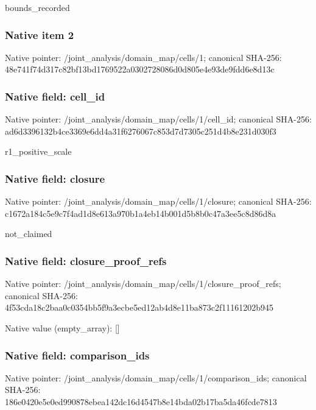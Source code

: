 \documentclass[10pt,a4paper]{article}
\begin{document}
\begingroup\raggedright\sloppy bounds\_\allowbreak{}recorded\par\endgroup

\subsubsection{Native item 2}
Native pointer: /joint\_\allowbreak{}analysis/domain\_\allowbreak{}map/cells/1; canonical SHA-256: 48e741f74d317c82bf13bd1769522a0302728086d0d805e4e93de9fdd6e8d13c

\subsubsection{Native field: cell\_\allowbreak{}id}
Native pointer: /joint\_\allowbreak{}analysis/domain\_\allowbreak{}map/cells/1/cell\_\allowbreak{}id; canonical SHA-256: ad6d3396132b4ce3369e6dd4a31f6276067c853d7d7305c251d4b8e231d030f3

\begingroup\raggedright\sloppy r1\_\allowbreak{}positive\_\allowbreak{}scale\par\endgroup

\subsubsection{Native field: closure}
Native pointer: /joint\_\allowbreak{}analysis/domain\_\allowbreak{}map/cells/1/closure; canonical SHA-256: c1672a184c5e9c7f4ad1d8e613a970b1a4eb14b001d5b8b0c47a3ee5c8d86d8a

\begingroup\raggedright\sloppy not\_\allowbreak{}claimed\par\endgroup

\subsubsection{Native field: closure\_\allowbreak{}proof\_\allowbreak{}refs}
Native pointer: /joint\_\allowbreak{}analysis/domain\_\allowbreak{}map/cells/1/closure\_\allowbreak{}proof\_\allowbreak{}refs; canonical SHA-256: 4f53cda18c2baa0c0354bb5f9a3ecbe5ed12ab4d8e11ba873c2f11161202b945

Native value (empty\_\allowbreak{}array): []

\subsubsection{Native field: comparison\_\allowbreak{}ids}
Native pointer: /joint\_\allowbreak{}analysis/domain\_\allowbreak{}map/cells/1/comparison\_\allowbreak{}ids; canonical SHA-256: 186e0420e5e0ed990878ebea142dc16d4547b8e14bda02b17ba5da46fcde7813
\end{document}
